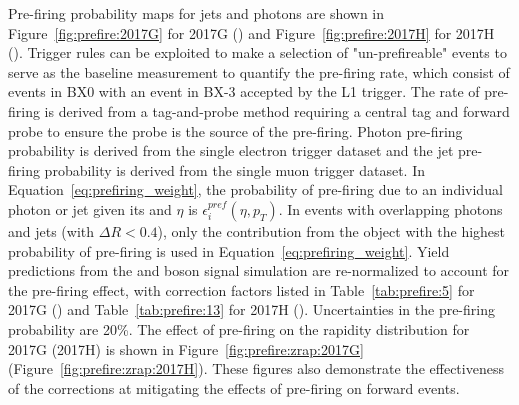 Pre-firing probability maps for jets and photons are shown in Figure~\ref{fig:prefire:2017G} for 2017G (\sg) and Figure~\ref{fig:prefire:2017H} for 2017H (\sh). Trigger rules can be exploited to make a selection of "un-prefireable" events to serve as the baseline measurement to quantify the pre-firing rate, which consist of events in BX0 with an event in BX-3 accepted by the L1 trigger. The rate of pre-firing is derived from a tag-and-probe method requiring a central tag and forward probe to ensure the probe is the source of the pre-firing.  Photon pre-firing probability is derived from the single electron trigger dataset and the jet pre-firing probability is derived from the single muon trigger dataset. In Equation~\ref{eq:prefiring_weight}, the probability of pre-firing due to an individual photon or jet given its \pt and $\eta$ is $\epsilon_i^{pref}(\eta,p_T)$. In events with overlapping photons and jets (with $\Delta  R < 0.4$), only the contribution from the object with the highest probability of pre-firing is used in Equation~\ref{eq:prefiring_weight}\cite{LATHOMAS}. Yield predictions from the \Wpm and \Z boson signal simulation are re-normalized to account for the pre-firing effect, with correction factors listed in Table~\ref{tab:prefire:5} for 2017G (\sg) and Table~\ref{tab:prefire:13} for 2017H (\sh). Uncertainties in the pre-firing probability are 20\%. The effect of pre-firing on the \zee rapidity distribution for 2017G (2017H) is shown in  Figure~\ref{fig:prefire:zrap:2017G} (Figure~\ref{fig:prefire:zrap:2017H}). These figures also demonstrate the effectiveness of the corrections at mitigating the effects of pre-firing on forward events.


